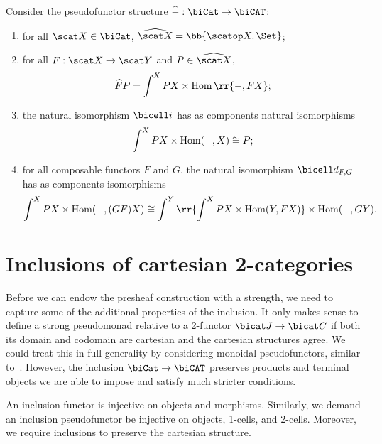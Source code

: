 \begin{example}\label{ex:presheaf_pseudofunctor}
  Consider the pseudofunctor structure $\widehat{-} : \biCat\to\biCAT$:
  \begin{enumerate}
    \item for all $\scat X\in\biCat$, $\widehat{\scat X}=\bb{\scatop X,\Set}$;
    \item for all $F:\scat X\to\scat Y$ and $P\in\widehat{\scat X}$,
      \begin{align*}
        \widehat{F}P = \int^X PX\times\Hom\rr{-,FX};
      \end{align*}
    \item the natural isomorphism $\bicell i$ has as components natural isomorphisms
      \begin{align*}
        \int^X PX\times\operatorname{Hom}(-,X) \cong P;
      \end{align*}
    \item for all composable functors $F$ and $G$, the natural isomorphism $\bicell d_{F,G}$
      has as components isomorphisms
      \begin{align*}
        \int^X PX\times\Hom(-,(GF)X) \cong \int^Y\rr{\int^X PX\times\Hom(Y,FX)}\times\Hom(-,GY).
      \end{align*}
  \end{enumerate}
\end{example}

\section{Inclusions of cartesian 2-categories}

Before we can endow the presheaf construction with a strength, we need to
capture some of the additional properties of the inclusion. It only makes sense
to define a strong pseudomonad relative to a 2-functor $\bicat J\to\bicat C$ if
both its domain and codomain are cartesian and the cartesian structures agree.
We could treat this in full generality by considering monoidal pseudofunctors,
similar to~\cite{tarmo}. However, the inclusion $\biCat\to\biCAT$ preserves
products and terminal objects we are able to impose and satisfy much stricter
conditions.

An inclusion functor is injective on objects and morphisms. Similarly, we demand an
inclusion pseudofunctor be injective on objects, 1-cells, and 2-cells. Moreover,
we require inclusions to preserve the cartesian structure.


